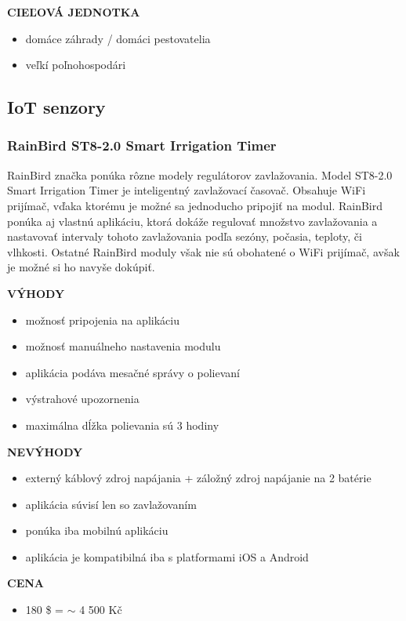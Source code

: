 \documentclass[twoside]{ctuthesis}
\theoremstyle{plain}
\theoremstyle{definition}
\theoremstyle{note}
\begin{document}
\textbf{CIEĽOVÁ JEDNOTKA}
\begin{itemize}
\item domáce záhrady / domáci pestovatelia
\item veľkí poľnohospodári
\end{itemize} 

\subsection{IoT senzory}

\subsubsection*{RainBird ST8-2.0 Smart Irrigation Timer}
RainBird značka ponúka rôzne modely regulátorov zavlažovania. Model ST8-2.0 Smart Irrigation Timer je inteligentný zavlažovací časovač. Obsahuje WiFi prijímač, vďaka ktorému je možné sa jednoducho pripojiť na modul. RainBird ponúka aj vlastnú aplikáciu, ktorá dokáže regulovať množstvo zavlažovania a nastavovať intervaly tohoto zavlažovania podľa sezóny, počasia, teploty, či vlhkosti. Ostatné RainBird moduly však nie sú obohatené o WiFi prijímač, avšak je možné si ho navyše dokúpiť. \cite{rainbird}
\newline

\textbf{VÝHODY}
\begin{itemize}
\item možnosť pripojenia na aplikáciu
\item možnosť manuálneho nastavenia modulu
\item aplikácia podáva mesačné správy o polievaní
\item výstrahové upozornenia
\item maximálna dĺžka polievania sú 3 hodiny
\end{itemize}

\textbf{NEVÝHODY}
\begin{itemize}
\item externý káblový zdroj napájania + záložný zdroj napájanie na 2 batérie 
\item aplikácia súvisí len so zavlažovaním
\item ponúka iba mobilnú aplikáciu 
\item aplikácia je kompatibilná iba s platformami iOS a Android
\end{itemize}

\textbf{CENA}
\begin{itemize}
\item 180  \$ = $\sim$ 4 500 Kč
\end{itemize}
\end{document}
